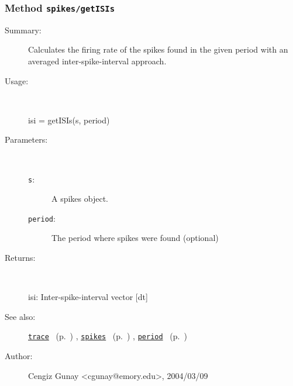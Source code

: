 \subsubsection[Method \texttt{getISIs}]{Method \texttt{spikes/getISIs}}%
%
\label{ref_spikes__getISIs}%
\hypertarget{ref_spikes__getISIs}{}%
\begin{description}
\item[Summary:]Calculates the firing rate of the spikes found in the given 
		period with an averaged inter-spike-interval approach.
%
\item[Usage:]~%
\begin{lyxcode}%
isi = getISIs(s, period)
%
\end{lyxcode}%
%
%
\item[Parameters:]~
\begin{description}%
\item[\texttt{s}:]
 A spikes object.
\item[\texttt{period}:]
 The period where spikes were found (optional)
\end{description}%
%
\item[Returns:
]~

	isi: Inter-spike-interval vector [dt]
%
%
\item[See also:]%
\hyperlink{ref_trace}{\texttt{trace}}%
\ (p.~\pageref{ref_trace})%
%
, \hyperlink{ref_spikes}{\texttt{spikes}}%
\ (p.~\pageref{ref_spikes})%
%
, \hyperlink{ref_period}{\texttt{period}}%
\ (p.~\pageref{ref_period})%
%
%
\item[Author:]%
Cengiz Gunay <cgunay@emory.edu>, 2004/03/09
%
\end{description}
\methodline%
